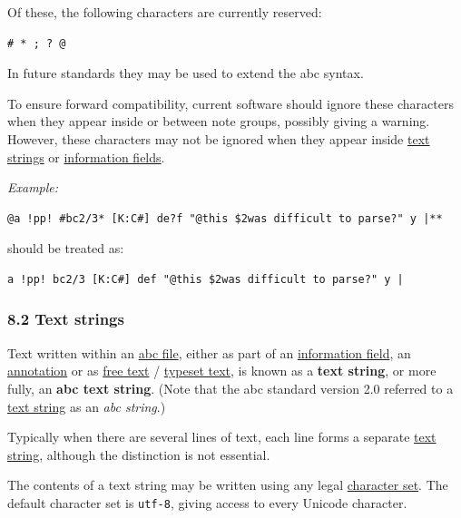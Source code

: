 \documentclass[oneside]{book}
\begin{document}
Of these, the following characters are currently reserved:

\begin{verbatim}
# * ; ? @
\end{verbatim}

In future standards they may be used to extend the abc syntax.

To ensure forward compatibility, current software should ignore these
characters when they appear inside or between note groups, possibly
giving a warning. However, these characters may not be ignored when they
appear inside \protect\hyperlink{text_string_definition}{text strings}
or \protect\hyperlink{information_field_definition}{information fields}.

\emph{Example:}

\begin{verbatim}
@a !pp! #bc2/3* [K:C#] de?f "@this $2was difficult to parse?" y |**
\end{verbatim}

should be treated as:

\begin{verbatim}
a !pp! bc2/3 [K:C#] def "@this $2was difficult to parse?" y |
\end{verbatim}

\hypertarget{text_strings}{\subsubsection{8.2 Text
strings}\label{text_strings}}

\href{}{}Text written within an
\protect\hyperlink{abc_file_definition}{abc file}, either as part of an
\protect\hyperlink{information_field_definition}{information field}, an
\protect\hyperlink{annotations}{annotation} or as
\protect\hyperlink{free_text_definition}{free text} /
\protect\hyperlink{typeset_text_definition}{typeset text}, is known as a
\textbf{text string}, or more fully, an \textbf{abc text string}. (Note
that the abc standard version 2.0 referred to a
\protect\hyperlink{text_string_definition}{text string} as an \emph{abc
string}.)

Typically when there are several lines of text, each line forms a
separate \protect\hyperlink{text_string_definition}{text string},
although the distinction is not essential.

The contents of a text string may be written using any legal
\protect\hyperlink{charset_field}{character set}. The default character
set is \texttt{utf-8}, giving access to every Unicode character.
\end{document}
